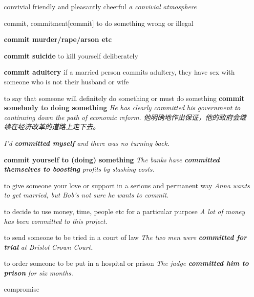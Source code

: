 \begin{DefWord}{convivial}
    friendly and pleasantly cheerful
    \textit{a convivial atmosphere}
\end{DefWord}

\begin{DefWord}{commit, commitment}[commit]
    to do something wrong or illegal

    \textbf{commit murder/rape/arson etc}

    \textbf{commit suicide} to kill yourself deliberately

    \textbf{commit adultery} if a married person commits adultery, they have sex with someone who is not their husband or wife

    to say that someone will definitely do something or must do something
    \textbf{commit somebody to doing something}
    \textit{He has clearly committed his government to continuing down the path of economic reform. 他明确地作出保证，他的政府会继续在经济改革的道路上走下去。 }

    \textit{I'd \textbf{committed myself} and there was no turning back.}

    \textbf{commit yourself to (doing) something} 
    \textit{The banks have \textbf{committed themselves to boosting} profits by slashing costs.}

    to give someone your love or support in a serious and permanent way
    \textit{Anna wants to get married, but Bob's not sure he wants to commit.}

    to decide to use money, time, people etc for a particular purpose
    \textit{A lot of money has been committed to this project.}

    to send someone to be tried in a court of law
    \textit{The two men were \textbf{committed for trial} at Bristol Crown Court.}

    to order someone to be put in a hospital or prison
    \textit{The judge \textbf{committed him to prison} for six months.}
\end{DefWord}

\begin{DefWord}{compromise}
\end{DefWord}

